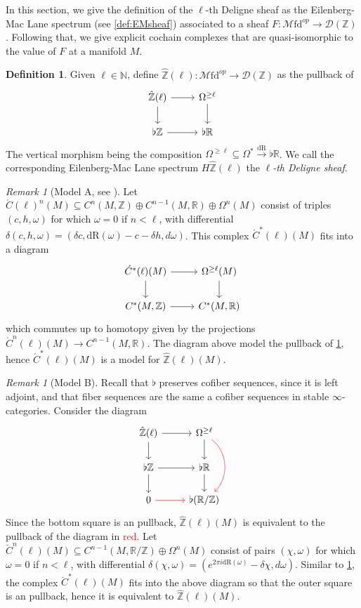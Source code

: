 \documentclass[10pt]{amsart}
\newcommand{\D}{\mathscr{D}}
\newcommand{\bN}{\mathbb{N}}
\newcommand{\bR}{\mathbb{R}}
\newcommand{\bZ}{\mathbb{Z}}
\newcommand{\Mfd}{\mathscr{M}\mathrm{fd}}
\newcommand{\dr}{\mathrm{dR}}
\theoremstyle{definition}
\newtheorem{definition}[equation]{Definition}
\theoremstyle{remark}
\newtheorem{remark}[equation]{Remark}
\numberwithin{equation}{section}
\begin{document}
In this section, we give the definition of the $\ell$-th Deligne sheaf as the Eilenberg-Mac Lane spectrum (see \cref{def:EMsheaf}) associated to a sheaf $F:\Mfd^{op}\to\D(\bZ)$. Following that, we give explicit cochain complexes that are quasi-isomorphic to the value of $F$ at a manifold $M$.
\begin{definition}\label{def:deligne}
  Given $\ell\in\bN$, define $\hat{\bZ}(\ell):\Mfd^{op}\to\D(\bZ)$ as the pullback of 
  \[\begin{tikzcd}
    \hat{\bZ}(\ell)\arrow[r]\arrow[d] & \Omega^{\geq \ell}\arrow[d] \\
    \flat\bZ \arrow[r] & \flat\bR
  \end{tikzcd}\]
  The vertical morphism being the composition $\Omega^{\geq \ell}\subseteq\Omega^*\xrightarrow{\dr}\flat\bR$. We call the corresponding Eilenberg-Mac Lane spectrum $H\hat{\bZ}(\ell)$ the $\ell$\emph{-th Deligne sheaf}.
\end{definition}
\begin{remark}[Model A, see {\cite[\S 3.2]{hopkinssinger2005diffcoh}}]\label{rmk:A} Let $\acute{C}(\ell)^n(M)\subseteq C^n(M,\bZ)\oplus C^{n-1}(M,\bR)\oplus\Omega^n(M)$ consist of triples $(c,h,\omega)$ for which $\omega=0$ if $n<\ell$, with differential $\delta(c,h,\omega)=(\delta c,\dr(\omega)-c-\delta h,d\omega)$. This complex $\acute{C}^*(\ell)(M)$ fits into a diagram
\[\begin{tikzcd}
    \acute{C}^*(\ell)(M) \arrow[d]\arrow[r] & \Omega^{\geq \ell}(M)\arrow[d] \\
    C^*(M,\bZ) \arrow[r] & C^*(M,\bR)
  \end{tikzcd}\]which commutes up to homotopy given by the projections $\acute{C}^n(\ell)(M)\to C^{n-1}(M,\bR)$. The diagram above model the pullback of \cref{def:deligne}, hence $\acute{C}^*(\ell)(M)$ is a model for $\hat{\bZ}(\ell)(M)$. 
\end{remark}
\begin{remark}[Model B]\label{rmk:B} Recall that $\flat$ preserves cofiber sequences, since it is left adjoint, and that fiber sequences are the same a cofiber sequences in stable $\infty$-categories. Consider the diagram
  \[\begin{tikzcd}
    \hat{\bZ}(\ell)\arrow[r]\arrow[d] & \Omega^{\geq \ell}\arrow[d]\arrow[dd,bend left=5em,color=red] \\
    \flat\bZ \arrow[r]\arrow[d] & \flat\bR\arrow[d] \\
    0\arrow[r,color=red] & \flat(\bR/\bZ)
  \end{tikzcd}\]
  Since the bottom square is an pullback, $\hat{\bZ}(\ell)(M)$ is equivalent to the pullback of the diagram in \textcolor{red}{red}. Let $\breve{C}^{n}(\ell)(M)\subseteq C^{n-1}(M,\bR/\bZ)\oplus\Omega^n(M)$ consist of pairs $(\chi,\omega)$ for which $\omega=0$ if $n<\ell$, with differential $\delta(\chi,\omega)=(e^{2\pi i\dr(\omega)}-\delta\chi,d\omega)$. Similar to \cref{rmk:A}, the complex $\breve{C}^*(\ell)(M)$ fits into the above diagram so that the outer square is an pullback, hence it is equivalent to $\hat{\bZ}(\ell)(M)$.
\end{remark}
\end{document}
